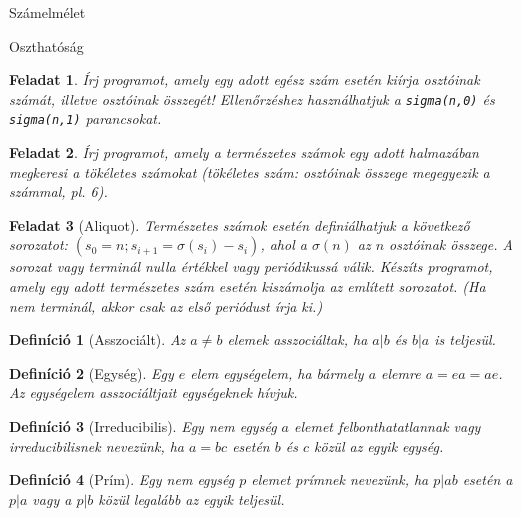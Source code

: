 \documentclass{amsbook}
\theoremstyle{mystyle}
\newtheorem{exercise}{Feladat}[part]
\newtheorem{definition}{Definíció}[section]
\begin{document}
\begin{part}{Számelmélet}
\begin{section}{Oszthatóság}
  \begin{exercise} Írj programot, amely egy adott egész szám esetén kiírja
    osztóinak számát, illetve osztóinak összegét! Ellenőrzéshez
    használhatjuk a \verb|sigma(n,0)| és \verb|sigma(n,1)| parancsokat.
  \end{exercise}

  \begin{exercise} Írj programot, amely a természetes számok egy adott
    halmazában megkeresi a tökéletes számokat (tökéletes szám: osztóinak 
    összege megegyezik a számmal, pl. 6).
  \end{exercise}
  
  \begin{exercise}[Aliquot] Természetes számok esetén definiálhatjuk a következő
    sorozatot: $(s_0 = n; s_{i+1} = \sigma(s_i) - s_i)$, ahol a $\sigma(n)$
    az $n$ osztóinak összege. A sorozat vagy terminál nulla értékkel vagy
    periódikussá válik. Készíts programot, amely egy adott természetes szám 
    esetén kiszámolja az említett sorozatot. (Ha nem terminál, akkor csak az 
    első periódust írja ki.)
  \end{exercise}

  \begin{definition}[Asszociált] Az $a\neq b$ elemek asszociáltak, ha $a|b$ és 
    $b|a$ is teljesül.
  \end{definition}

  \begin{definition}[Egység] Egy $e$ elem egységelem, ha bármely $a$ elemre
    $a=ea=ae$. Az egységelem asszociáltjait egységeknek hívjuk.
  \end{definition}

  \begin{definition}[Irreducibilis] Egy nem egység $a$ elemet felbonthatatlannak vagy 
    irreducibilisnek nevezünk, ha $a=bc$ esetén $b$ és $c$ közül az 
    egyik egység.
  \end{definition}

  \begin{definition}[Prím] Egy nem egység $p$ elemet prímnek nevezünk, ha $p|ab$
    esetén a $p|a$ vagy a $p|b$ közül legalább az egyik teljesül.
  \end{definition}


\end{section}
\end{part}
\end{document}
